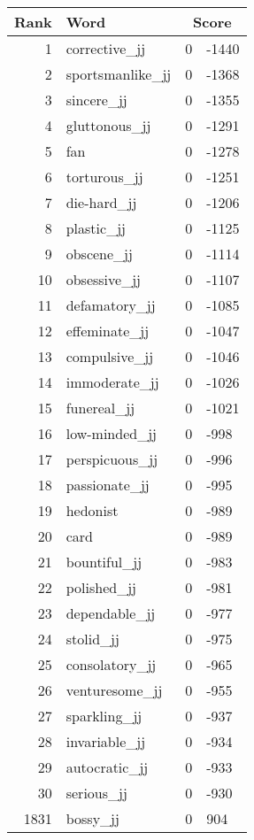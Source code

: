 \begin{longtable}[!htbp]{| rlr@{.}l |}
    \hline
    \textbf{Rank} & \textbf{Word} & \multicolumn{2}{c|}{\textbf{Score}} \\
    \hline
    \endhead
    1 & corrective\_jj & 0 & -1440 \\
    2 & sportsmanlike\_jj & 0 & -1368 \\
    3 & sincere\_jj & 0 & -1355 \\
    4 & gluttonous\_jj & 0 & -1291 \\
    5 & fan & 0 & -1278 \\
    6 & torturous\_jj & 0 & -1251 \\
    7 & die-hard\_jj & 0 & -1206 \\
    8 & plastic\_jj & 0 & -1125 \\
    9 & obscene\_jj & 0 & -1114 \\
    10 & obsessive\_jj & 0 & -1107 \\
    11 & defamatory\_jj & 0 & -1085 \\
    12 & effeminate\_jj & 0 & -1047 \\
    13 & compulsive\_jj & 0 & -1046 \\
    14 & immoderate\_jj & 0 & -1026 \\
    15 & funereal\_jj & 0 & -1021 \\
    16 & low-minded\_jj & 0 & -998 \\
    17 & perspicuous\_jj & 0 & -996 \\
    18 & passionate\_jj & 0 & -995 \\
    19 & hedonist & 0 & -989 \\
    20 & card & 0 & -989 \\
    21 & bountiful\_jj & 0 & -983 \\
    22 & polished\_jj & 0 & -981 \\
    23 & dependable\_jj & 0 & -977 \\
    24 & stolid\_jj & 0 & -975 \\
    25 & consolatory\_jj & 0 & -965 \\
    26 & venturesome\_jj & 0 & -955 \\
    27 & sparkling\_jj & 0 & -937 \\
    28 & invariable\_jj & 0 & -934 \\
    29 & autocratic\_jj & 0 & -933 \\
    30 & serious\_jj & 0 & -930 \\
    1831 & bossy\_jj & 0 & 904 \\

\end{longtable}
